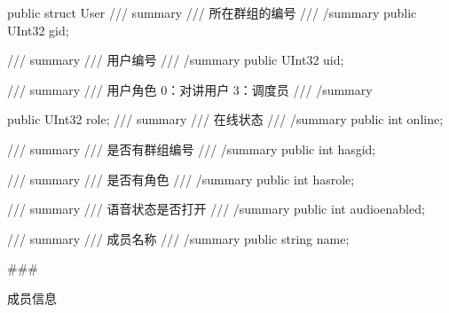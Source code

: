 \documentclass[letterpaper,10pt,english]{sphinxmanual}
\begin{document}
%
\begin{sphinxVerbatim}[commandchars=\\\{\}]
public struct User
\PYGZob{}
  /// \PYGZlt{}summary\PYGZgt{}
  /// 所在群组的编号
  /// \PYGZlt{}/summary\PYGZgt{}
  public UInt32 gid;

  /// \PYGZlt{}summary\PYGZgt{}
  /// 用户编号
  /// \PYGZlt{}/summary\PYGZgt{}
  public UInt32 uid;

  /// \PYGZlt{}summary\PYGZgt{}
  /// 用户角色 0：对讲用户 3：调度员
  /// \PYGZlt{}/summary\PYGZgt{}

  public UInt32 role;
  /// \PYGZlt{}summary\PYGZgt{}
  /// 在线状态
  /// \PYGZlt{}/summary\PYGZgt{}
  public int online;

  /// \PYGZlt{}summary\PYGZgt{}
  /// 是否有群组编号
  /// \PYGZlt{}/summary\PYGZgt{}
  public int has\PYGZus{}gid;

  /// \PYGZlt{}summary\PYGZgt{}
  /// 是否有角色
  /// \PYGZlt{}/summary\PYGZgt{}
  public int has\PYGZus{}role;

  /// \PYGZlt{}summary\PYGZgt{}
  /// 语音状态是否打开
  /// \PYGZlt{}/summary\PYGZgt{}
  public int audio\PYGZus{}enabled;

  /// \PYGZlt{}summary\PYGZgt{}
  /// 成员名称
  /// \PYGZlt{}/summary\PYGZgt{}
  public string name;
\PYGZcb{}
\end{sphinxVerbatim}

\#\#\#



成员信息
\end{document}
